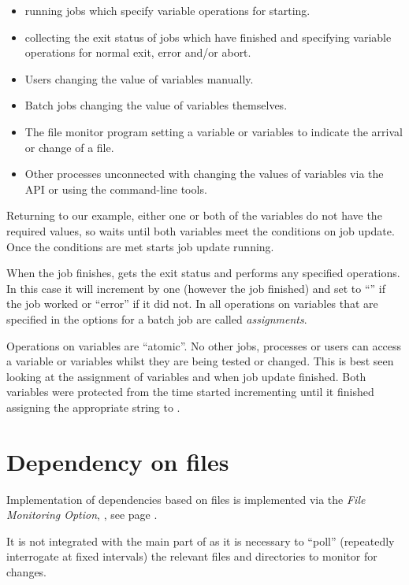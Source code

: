 \begin{itemize}
\item \ProductName{} running jobs which specify variable operations for starting.
\item \ProductName{} collecting the exit status of jobs which have finished and specifying variable operations for normal exit, error and/or abort.
\item Users changing the value of variables manually.
\item Batch jobs changing the value of variables themselves.
\item The file monitor program \PrBtfilemon{} setting a variable or variables to indicate the arrival or change of a file.
\item Other processes unconnected with \ProductName{} changing the values of variables via the API or using the command-line tools.
\end{itemize}
Returning to our example, either one or both of the variables do not have the required values, so \ProductName{} waits until both variables meet
the conditions on job update. Once the conditions are met \ProductName{} starts job update running.

When the job finishes, \ProductName{} gets the exit status and performs any specified operations. In this case it will increment
 by one (however the job finished) and set  to ``'' if the job
worked or ``error'' if it did not. In \ProductName{} all operations on variables that are specified in the options
for a batch job are called \textit{assignments}.

Operations on variables are ``atomic''. No other jobs, processes or users can access a variable or variables
whilst they are being tested or changed. This is best seen looking at the assignment of variables  and
 when job update finished. Both variables were protected from the time \ProductName{} started incrementing
 until it finished assigning the appropriate string to .

\section{Dependency on files}
Implementation of dependencies based on files is implemented via the \textit{File Monitoring Option}, \PrBtfilemon{},
see page \pageref{btfilemon:startdoc}.

It is not integrated with the main part of \ProductName{} as it is necessary to ``poll'' (repeatedly interrogate at fixed
intervals) the relevant files and directories to monitor for changes.

